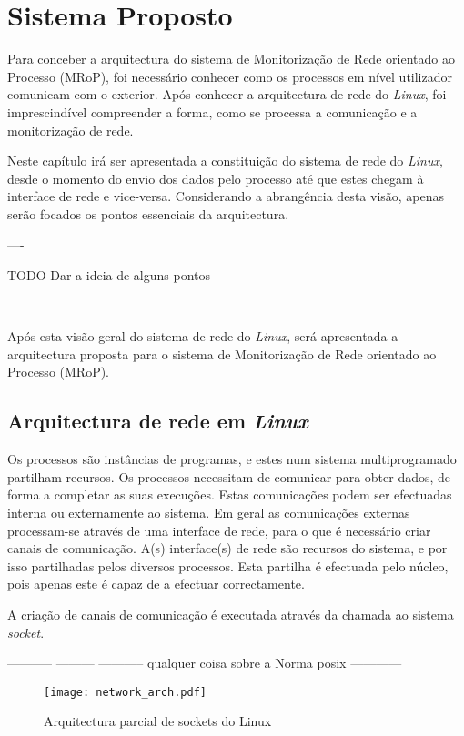\chapter{Sistema Proposto}
\label{cap:Estrutura}

Para conceber a arquitectura do sistema de Monitorização de Rede orientado ao Processo (MRoP), foi necessário conhecer como os processos em nível utilizador comunicam com o exterior.
Após conhecer a arquitectura de rede do \textit{Linux}, foi imprescindível compreender a forma, como se processa a comunicação e a monitorização de rede.

Neste capítulo irá ser apresentada a constituição do sistema de rede do \textit{Linux}, desde o momento do envio dos dados pelo processo até que estes chegam à interface de rede e vice-versa.
Considerando a abrangência desta visão, apenas serão focados os pontos essenciais da arquitectura. 

---- 

TODO Dar a ideia de alguns pontos 

----

Após esta visão geral do sistema de rede do \textit{Linux}, será apresentada a arquitectura proposta para o sistema de Monitorização de Rede orientado ao Processo (MRoP).



\section{Arquitectura de rede em \textit{Linux}}
\label{sub:network}

Os processos são instâncias de programas, e estes num sistema multiprogramado partilham recursos.
Os processos necessitam de comunicar para obter dados, de forma a completar as suas execuções.
Estas comunicações podem ser efectuadas interna ou externamente ao sistema.
Em geral as comunicações externas processam-se através de uma interface de rede, para o que é necessário criar canais de comunicação.
A(s) interface(s) de rede são recursos do sistema, e por isso partilhadas pelos diversos processos.
Esta partilha é efectuada pelo núcleo, pois apenas este é capaz de a efectuar correctamente.

A criação de canais de comunicação é executada através da chamada ao sistema \textit{socket}.

----------- --------- ----------- qualquer coisa sobre a Norma posix ------------

\begin{figure}[htbp]
\centering
\texttt{[image: network\_arch.pdf]} 
\caption{Arquitectura parcial de sockets do Linux}
\label{fig:network_arch}
\end{figure}

